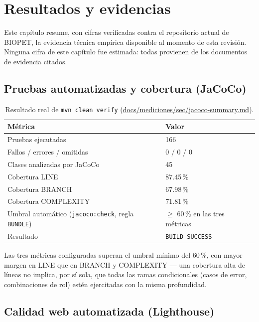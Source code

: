 \chapter{Resultados y evidencias}
\label{cap:resultados}

Este cap\'itulo resume, con cifras verificadas contra el repositorio actual
de BIOPET, la evidencia t\'ecnica emp\'irica disponible al momento de esta
revisi\'on. Ninguna cifra de este cap\'itulo fue estimada: todas provienen
de los documentos de evidencia citados.

\section{Pruebas automatizadas y cobertura (JaCoCo)}
\label{sec:pruebas-jacoco}

\begin{table}[H]
  \centering
  \caption{Resultado real de \texttt{mvn clean verify} (\url{docs/mediciones/sec/jacoco-summary.md}).}
  \label{tab:jacoco}
  \begin{tabular}{@{}ll@{}}
    \toprule
    M\'etrica & Valor \\
    \midrule
    Pruebas ejecutadas & 166 \\
    Fallos / errores / omitidas & 0 / 0 / 0 \\
    Clases analizadas por JaCoCo & 45 \\
    Cobertura LINE & 87.45\,\% \\
    Cobertura BRANCH & 67.98\,\% \\
    Cobertura COMPLEXITY & 71.81\,\% \\
    Umbral autom\'atico (\texttt{jacoco:check}, regla \texttt{BUNDLE}) & $\geq$ 60\,\% en las tres m\'etricas \\
    Resultado & \texttt{BUILD SUCCESS} \\
    \bottomrule
  \end{tabular}
\end{table}

Las tres m\'etricas configuradas superan el umbral m\'inimo del 60\,\%, con
mayor margen en LINE que en BRANCH y COMPLEXITY --- una cobertura alta de
l\'ineas no implica, por s\'i sola, que todas las ramas condicionales
(casos de error, combinaciones de rol) est\'en ejercitadas con la misma
profundidad.

\section{Calidad web automatizada (Lighthouse)}
\label{sec:resultados-lighthouse}


